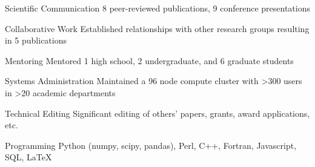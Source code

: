 


\begin{cvskills}


\cvskill
{Scientific Communication} %
{8 peer-reviewed publications, 9 conference presentations} %


\cvskill
{Collaborative Work} %
{Established relationships with other research groups resulting in 5 publications} %


\cvskill
{Mentoring} %
{Mentored 1 high school, 2 undergraduate, and 6 graduate students} %


\cvskill
{Systems Administration} %
{Maintained a 96 node compute cluster with >300 users in >20 academic departments} %


\cvskill
{Technical Editing} %
{Significant editing of others' papers, grants, award applications, etc.} %


\cvskill
{Programming} %
{Python (numpy, scipy, pandas), Perl, C++, Fortran, Javascript, SQL, LaTeX} %


\end{cvskills}

